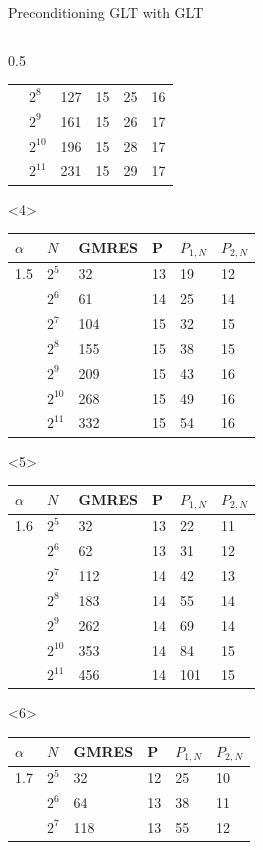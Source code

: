 \documentclass[aspectratio=169,xcolor=dvipsnames]{beamer}
\begin{document}
\begin{frame}{Preconditioning GLT with GLT}
\begin{columns}
\begin{column}{0.5\columnwidth}
\begin{onlyenv}
\begin{tabular}{llllll}
& $2^{8}$ & 127 & 15 & 25 & 16 \\
& $2^{9}$ & 161 & 15 & 26 & 17 \\
& $2^{10}$ & 196 & 15 & 28 & 17 \\
& $2^{11}$ & 231 & 15 & 29 & 17 \\
		\bottomrule
	\end{tabular}
\end{onlyenv}
\begin{onlyenv}<4>
	\begin{tabular}{llllll}
		\toprule
		$\alpha$ & $N$ & GMRES & P & $P_{1,N}$ & $P_{2,N}$ \\
		\midrule
 1.5 & $2^{5}$ & 32 & 13 & 19 & 12\\
& $2^{6}$ & 61 & 14 & 25 & 14 \\
& $2^{7}$ & 104 & 15 & 32 & 15 \\
& $2^{8}$ & 155 & 15 & 38 & 15 \\
& $2^{9}$ & 209 & 15 & 43 & 16 \\
& $2^{10}$ & 268 & 15 & 49 & 16 \\
& $2^{11}$ & 332 & 15 & 54 & 16 \\
		\bottomrule
	\end{tabular}
\end{onlyenv}
\begin{onlyenv}<5>
	\begin{tabular}{llllll}
		\toprule
		$\alpha$ & $N$ & GMRES & P & $P_{1,N}$ & $P_{2,N}$ \\
		\midrule
 1.6 & $2^{5}$ & 32 & 13 & 22 & 11\\
& $2^{6}$ & 62 & 13 & 31 & 12 \\
& $2^{7}$ & 112 & 14 & 42 & 13 \\
& $2^{8}$ & 183 & 14 & 55 & 14 \\
& $2^{9}$ & 262 & 14 & 69 & 14 \\
& $2^{10}$ & 353 & 14 & 84 & 15 \\
& $2^{11}$ & 456 & 14 & 101 & 15 \\
		\bottomrule
	\end{tabular}
\end{onlyenv}
\begin{onlyenv}<6>
	\begin{tabular}{llllll}
		\toprule
		$\alpha$ & $N$ & GMRES & P & $P_{1,N}$ & $P_{2,N}$ \\
		\midrule
 1.7 & $2^{5}$ & 32 & 12 & 25 & 10\\
& $2^{6}$ & 64 & 13 & 38 & 11 \\
& $2^{7}$ & 118 & 13 & 55 & 12 \\

\end{tabular}
\end{onlyenv}
\end{column}
\end{columns}
\end{frame}
\end{document}
